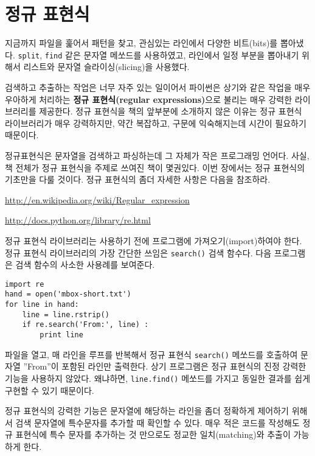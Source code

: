 
\chapter{정규 표현식}

지금까지 파일을 훑어서 패턴을 찾고, 관심있는 라인에서 다양한 비트(bits)를 뽑아냈다. 
{\tt split}, {\tt find} 같은 문자열 메쏘드를 사용하였고, 라인에서 일정 부분을 뽑아내기 위해서 리스트와 문자열 슬라이싱(slicing)을 사용했다.


검색하고 추출하는 작업은 너무 자주 있는 일이어서 파이썬은 상기와 같은 작업을 매우 우아하게 처리하는 {\bf 정규 표현식(regular expressions)}으로 불리는 
매우 강력한 라이브러리를 제공한다.
정규 표현식을 책의 앞부분에 소개하지 않은 이유는 정규 표현식 라이브러리가 매우 강력하지만, 약간 복잡하고, 구문에 익숙해지는데 시간이 필요하기 때문이다.

정규표현식은 문자열을 검색하고 파싱하는데 그 자체가 작은 프로그래밍 언어다.
사실, 책 전체가 정규 표현식을 주제로 쓰여진 책이 몇권있다.
이번 장에서는 정규 표현식의 기초만을 다룰 것이다.
정규 표현식의 좀더 자세한 사항은 다음을 참조하라.

\url{http://en.wikipedia.org/wiki/Regular_expression}

\url{http://docs.python.org/library/re.html}

정규 표현식 라이브러리는 사용하기 전에 프로그램에 가져오기(import)하여야 한다.
정규 표현식 라이브러리의 가장 간단한 쓰임은  {\tt search()} 검색 함수다. 
다음 프로그램은 검색 함수의 사소한 사용례를 보여준다.


\beforeverb
\begin{verbatim}
import re
hand = open('mbox-short.txt')
for line in hand:
    line = line.rstrip()
    if re.search('From:', line) :
        print line
\end{verbatim}
\afterverb
%

파일을 열고, 매 라인을 루프를 반복해서 정규 표현식 {\tt search()} 메쏘드를 호출하여 문자열 ''From''이 포함된 라인만 출력한다.
상기 프로그램은 정규 표현식의 진정 강력한 기능을 사용하지 않았다. 왜냐하면, {\tt line.find()} 메쏘드를 가지고 동일한 결과를 쉽게 구현할 수 있기 때문이다.


정규 표현식의 강력한 기능은 문자열에 해당하는 라인을 좀더 정확하게 제어하기 위해서 검색 문자열에 특수문자를 추가할 때 확인할 수 있다.
매우 적은 코드를 작성해도 정규 표현식에 특수 문자를 추가하는 것 만으로도 정교한 일치(matching)와 추출이 가능하게 한다.

